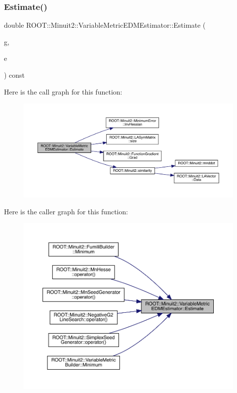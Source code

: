\subsubsection{\texorpdfstring{Estimate()}{Estimate()}\hspace{0.1cm}{\footnotesize\ttfamily [1/3]}}
{\footnotesize\ttfamily double R\+O\+O\+T\+::\+Minuit2\+::\+Variable\+Metric\+E\+D\+M\+Estimator\+::\+Estimate (\begin{DoxyParamCaption}\item[{const \mbox{\hyperlink{classROOT_1_1Minuit2_1_1FunctionGradient}{Function\+Gradient}} \&}]{g,  }\item[{const \mbox{\hyperlink{classROOT_1_1Minuit2_1_1MinimumError}{Minimum\+Error}} \&}]{e }\end{DoxyParamCaption}) const}

Here is the call graph for this function\+:
\nopagebreak
\begin{figure}[H]
\begin{center}
\leavevmode
\includegraphics[width=350pt]{d7/de3/classROOT_1_1Minuit2_1_1VariableMetricEDMEstimator_a3c4d22f40ab9ea39de88cca47ddfcb5f_cgraph}
\end{center}
\end{figure}
Here is the caller graph for this function\+:
\nopagebreak
\begin{figure}[H]
\begin{center}
\leavevmode
\includegraphics[width=350pt]{d7/de3/classROOT_1_1Minuit2_1_1VariableMetricEDMEstimator_a3c4d22f40ab9ea39de88cca47ddfcb5f_icgraph}
\end{center}
\end{figure}
